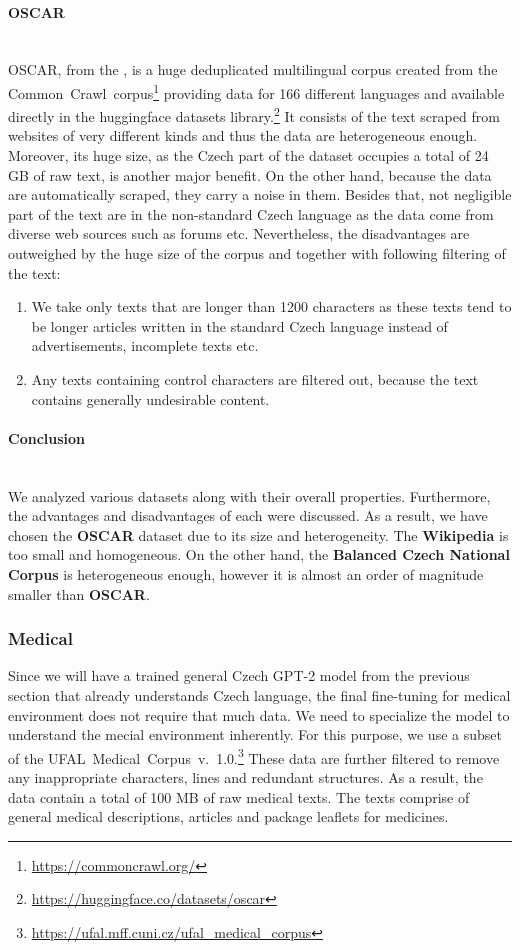 \paragraph*{OSCAR} ~\\
\indent OSCAR, from the \citet{ortiz-suarez-etal-2020-monolingual}, is a huge deduplicated multilingual corpus created from the Common~Crawl~corpus\footnote[3]{\url{https://commoncrawl.org/}} providing data for 166 different languages and available directly in the huggingface datasets library.\footnote[4]{\url{https://huggingface.co/datasets/oscar}} It consists of the text scraped from websites of very different kinds and thus the data are heterogeneous enough. Moreover, its huge size, as the Czech part of the dataset occupies a total of 24 GB of raw text, is another major benefit. On the other hand, because the data are automatically scraped, they carry a noise in them. Besides that, not negligible part of the text are in the non-standard Czech language as the data come from diverse web sources such as forums etc. Nevertheless, the disadvantages are outweighed by the huge size of the corpus and together with following filtering of the text:
\begin{enumerate}
	\item We take only texts that are longer than 1200 characters as these texts tend to be longer articles written in the standard Czech language instead of advertisements, incomplete texts etc.
	\item Any texts containing control characters are filtered out, because the text contains generally undesirable content.
\end{enumerate}

\paragraph*{Conclusion} ~\\
\indent We analyzed various datasets along with their overall properties. Furthermore, the advantages and disadvantages of each were discussed. As a result, we have chosen the \textbf{OSCAR} dataset due to its size and heterogeneity. The \textbf{Wikipedia} is too small and homogeneous. On the other hand, the \textbf{Balanced Czech National Corpus} is heterogeneous enough, however it is almost an order of magnitude smaller than \textbf{OSCAR}.

\subsubsection{Medical}
Since we will have a trained general Czech GPT-2 model from the previous section that already understands Czech language, the final fine-tuning for medical environment does not require that much data. We need to specialize the model to understand the mecial environment inherently. For this purpose, we use a subset of the UFAL~Medical~Corpus~v.\ 1.0.\footnote[5]{\url{https://ufal.mff.cuni.cz/ufal\_medical\_corpus}} These data are further filtered to remove any inappropriate characters, lines and redundant structures. As a result, the data contain a total of 100 MB of raw medical texts. The texts comprise of general medical descriptions, articles and package leaflets for medicines.

